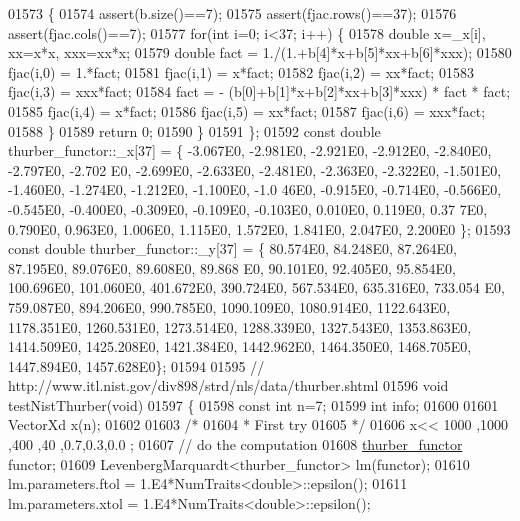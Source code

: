 \begin{DoxyCode}
01573     \{
01574         assert(b.size()==7);
01575         assert(fjac.rows()==37);
01576         assert(fjac.cols()==7);
01577         \textcolor{keywordflow}{for}(\textcolor{keywordtype}{int} i=0; i<37; i++) \{
01578             \textcolor{keywordtype}{double} x=\_x[i], xx=x*x, xxx=xx*x;
01579             \textcolor{keywordtype}{double} fact = 1./(1.+b[4]*x+b[5]*xx+b[6]*xxx);
01580             fjac(i,0) = 1.*fact;
01581             fjac(i,1) = x*fact;
01582             fjac(i,2) = xx*fact;
01583             fjac(i,3) = xxx*fact;
01584             fact = - (b[0]+b[1]*x+b[2]*xx+b[3]*xxx) * fact * fact;
01585             fjac(i,4) = x*fact;
01586             fjac(i,5) = xx*fact;
01587             fjac(i,6) = xxx*fact;
01588         \}
01589         \textcolor{keywordflow}{return} 0;
01590     \}
01591 \};
01592 \textcolor{keyword}{const} \textcolor{keywordtype}{double} thurber\_functor::\_x[37] = \{ -3.067E0, -2.981E0, -2.921E0, -2.912E0, -2.840E0, -2.797E0, -2.702
      E0, -2.699E0, -2.633E0, -2.481E0, -2.363E0, -2.322E0, -1.501E0, -1.460E0, -1.274E0, -1.212E0, -1.100E0, -1.0
      46E0, -0.915E0, -0.714E0, -0.566E0, -0.545E0, -0.400E0, -0.309E0, -0.109E0, -0.103E0, 0.010E0, 0.119E0, 0.37
      7E0, 0.790E0, 0.963E0, 1.006E0, 1.115E0, 1.572E0, 1.841E0, 2.047E0, 2.200E0 \};
01593 \textcolor{keyword}{const} \textcolor{keywordtype}{double} thurber\_functor::\_y[37] = \{ 80.574E0, 84.248E0, 87.264E0, 87.195E0, 89.076E0, 89.608E0, 89.868
      E0, 90.101E0, 92.405E0, 95.854E0, 100.696E0, 101.060E0, 401.672E0, 390.724E0, 567.534E0, 635.316E0, 733.054
      E0, 759.087E0, 894.206E0, 990.785E0, 1090.109E0, 1080.914E0, 1122.643E0, 1178.351E0, 1260.531E0, 1273.514E0, 
      1288.339E0, 1327.543E0, 1353.863E0, 1414.509E0, 1425.208E0, 1421.384E0, 1442.962E0, 1464.350E0, 1468.705E0, 
      1447.894E0, 1457.628E0\};
01594 
01595 \textcolor{comment}{// http://www.itl.nist.gov/div898/strd/nls/data/thurber.shtml}
01596 \textcolor{keywordtype}{void} testNistThurber(\textcolor{keywordtype}{void})
01597 \{
01598   \textcolor{keyword}{const} \textcolor{keywordtype}{int} n=7;
01599   \textcolor{keywordtype}{int} info;
01600 
01601   VectorXd x(n);
01602 
01603   \textcolor{comment}{/*}
01604 \textcolor{comment}{   * First try}
01605 \textcolor{comment}{   */}
01606   x<< 1000 ,1000 ,400 ,40 ,0.7,0.3,0.0 ;
01607   \textcolor{comment}{// do the computation}
01608   \hyperlink{structthurber__functor}{thurber\_functor} functor;
01609   LevenbergMarquardt<thurber\_functor> lm(functor);
01610   lm.parameters.ftol = 1.E4*NumTraits<double>::epsilon();
01611   lm.parameters.xtol = 1.E4*NumTraits<double>::epsilon();

\end{DoxyCode}
